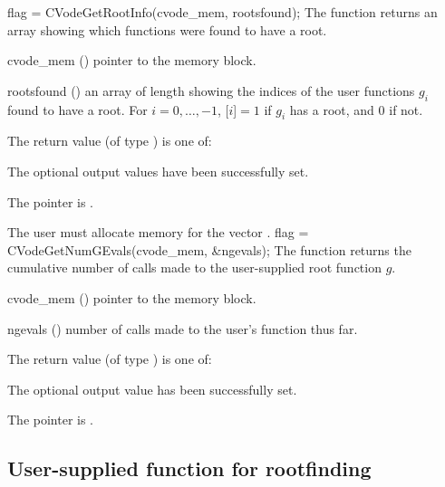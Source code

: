 {
  flag = CVodeGetRootInfo(cvode\_mem, rootsfound);
}
{
  The function  returns an array showing which 
  functions were found to have a root.
}
{
  \begin{args}
  \item[cvode\_mem] ()
    pointer to the {\cvodes} memory block.
  \item[rootsfound] ()
    an  array of length  showing the indices
    of the user functions $g_i$ found to have a root.  For
    $i=0,\ldots,$$-1$, [$i$]$=1$ if $g_i$
    has a root, and $0$ if not.
  \end{args}
}
{
  The return value  (of type ) is one of:
  \begin{args}
  \item[\Id{CV\_SUCCESS}] 
    The optional output values have been successfully set.
  \item[\Id{CV\_MEM\_NULL}]
    The  pointer is .
  \end{args}
}
{
  {\warn}The user must allocate memory for the vector .  
}
{
  flag = CVodeGetNumGEvals(cvode\_mem, \&ngevals);
}
{
  The function  returns the cumulative
  number of calls made to the user-supplied root function $g$.
}
{
  \begin{args}
  \item[cvode\_mem] ()
    pointer to the {\cvodes} memory block.
  \item[ngevals] ()
    number of calls made to the user's function  thus far.
  \end{args}
}
{
  The return value  (of type ) is one of:
  \begin{args}
  \item[\Id{CV\_SUCCESS}] 
    The optional output value has been successfully set.
  \item[\Id{CV\_MEM\_NULL}]
    The  pointer is .
  \end{args}
}
{}

\subsection{User-supplied function for rootfinding}\label{ss:root_us}

